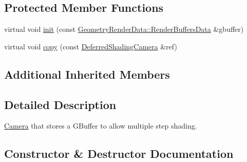 \subsection*{Protected Member Functions}
\begin{DoxyCompactItemize}
\item 
virtual void \mbox{\hyperlink{class_geometry_engine_1_1_geometry_world_item_1_1_geometry_camera_1_1_deferred_shading_camera_a31f4f7af970df8edd71b15ed56bdc906}{init}} (const \mbox{\hyperlink{class_geometry_engine_1_1_geometry_render_data_1_1_render_buffers_data}{Geometry\+Render\+Data\+::\+Render\+Buffers\+Data}} \&gbuffer)
\item 
virtual void \mbox{\hyperlink{class_geometry_engine_1_1_geometry_world_item_1_1_geometry_camera_1_1_deferred_shading_camera_a00eba99af30625646ea11f442ffa2742}{copy}} (const \mbox{\hyperlink{class_geometry_engine_1_1_geometry_world_item_1_1_geometry_camera_1_1_deferred_shading_camera}{Deferred\+Shading\+Camera}} \&ref)
\end{DoxyCompactItemize}
\subsection*{Additional Inherited Members}


\subsection{Detailed Description}
\mbox{\hyperlink{class_geometry_engine_1_1_geometry_world_item_1_1_geometry_camera_1_1_camera}{Camera}} that stores a G\+Buffer to allow multiple step shading. 

\subsection{Constructor \& Destructor Documentation}
\mbox{\label{class_geometry_engine_1_1_geometry_world_item_1_1_geometry_camera_1_1_deferred_shading_camera_a2905780ad7d5fc6046cc2d64e82ec1bd}} 
